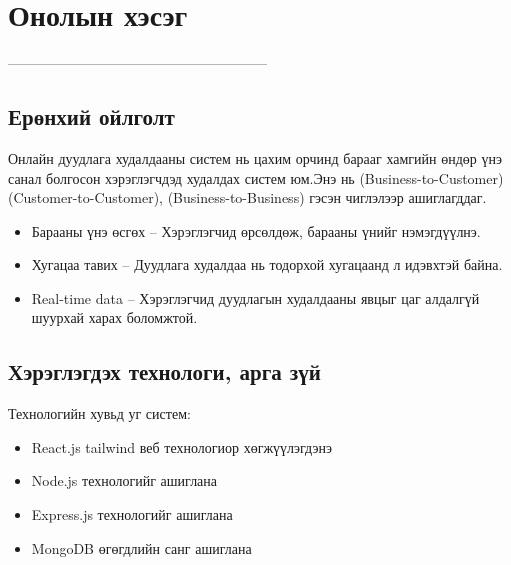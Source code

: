 
\chapter{Онолын хэсэг} %
\label{Chapter1} %


\newcommand{\keyword}[1]{\textbf{#1}}
\newcommand{\tabhead}[1]{\textbf{#1}}
\newcommand{\code}[1]{\texttt{#1}}
\newcommand{\file}[1]{\texttt{\bfseries#1}}
\newcommand{\option}[1]{\texttt{\itshape#1}}




--------------------------------------------------------
\section{Ерөнхий ойлголт}
Онлайн дуудлага худалдааны систем нь цахим орчинд барааг хамгийн өндөр үнэ санал болгосон хэрэглэгчдэд худалдах систем юм.Энэ нь  (Business-to-Customer) (Customer-to-Customer), (Business-to-Business) гэсэн чиглэлээр ашиглагддаг.
\begin{itemize}
\item Барааны үнэ өсгөх – Хэрэглэгчид өрсөлдөж, барааны үнийг нэмэгдүүлнэ.
\item Хугацаа тавих – Дуудлага худалдаа нь тодорхой хугацаанд л идэвхтэй байна.
\item Real-time data – Хэрэглэгчид дуудлагын худалдааны явцыг цаг алдалгүй шуурхай харах боломжтой.
\end{itemize}
\section{Хэрэглэгдэх технологи, арга зүй}
Технологийн хувьд уг систем:

\begin{itemize}
\item React.js tailwind веб технологиор хөгжүүлэгдэнэ
\item Node.js технологийг ашиглана
\item Express.js технологийг ашиглана
\item MongoDB өгөгдлийн санг ашиглана
\end{itemize}

